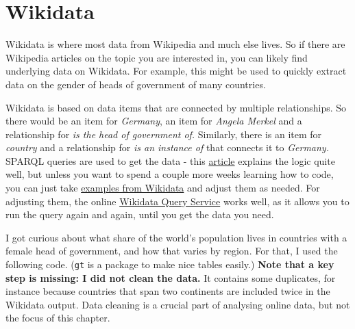 \documentclass[
]{book}
\begin{document}
\hypertarget{wikidata}{%
\section{Wikidata}\label{wikidata}}

Wikidata is where most data from Wikipedia and much else lives. So if there are Wikipedia articles on the topic you are interested in, you can likely find underlying data on Wikidata. For example, this might be used to quickly extract data on the gender of heads of government of many countries.

Wikidata is based on data items that are connected by multiple relationships. So there would be an item for \emph{Germany}, an item for \emph{Angela Merkel} and a relationship for \emph{is the head of government of.} Similarly, there is an item for \emph{country} and a relationship for \emph{is an instance of} that connects it to \emph{Germany.} SPARQL queries are used to get the data - this \href{https://towardsdatascience.com/a-brief-introduction-to-wikidata-bb4e66395eb1}{article} explains the logic quite well, but unless you want to spend a couple more weeks learning how to code, you can just take \href{https://www.wikidata.org/wiki/Wikidata:SPARQL_query_service/queries/examples}{examples from Wikidata} and adjust them as needed. For adjusting them, the online \href{https://query.wikidata.org/}{Wikidata Query Service} works well, as it allows you to run the query again and again, until you get the data you need.

I got curious about what share of the world's population lives in countries with a female head of government, and how that varies by region. For that, I used the following code. (\texttt{gt} is a package to make nice tables easily.) \textbf{Note that a key step is missing: I did not clean the data.} It contains some duplicates, for instance because countries that span two continents are included twice in the Wikidata output. Data cleaning is a crucial part of analysing online data, but not the focus of this chapter.
\end{document}
